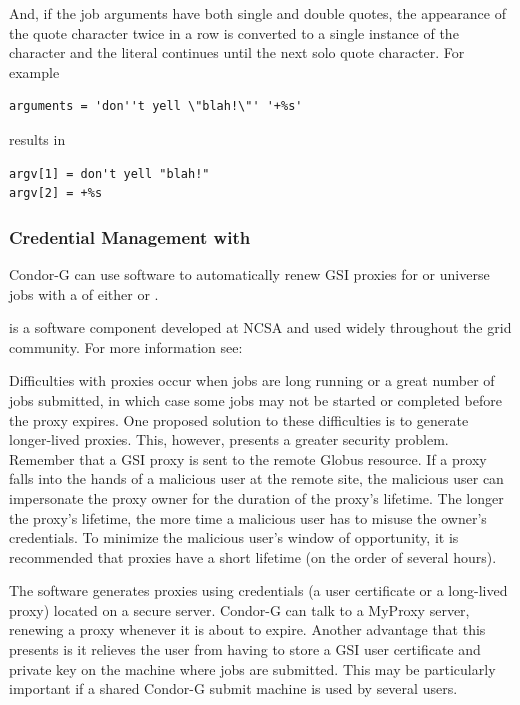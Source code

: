 And, if the job arguments have both single and double quotes,
the appearance of the quote character twice in a
row is converted to a single instance of the character and the literal
continues until the next solo quote character.
For example
\begin{verbatim}
arguments = 'don''t yell \"blah!\"' '+%s'
\end{verbatim}
results in
\begin{verbatim}
argv[1] = don't yell "blah!"
argv[2] = +%s
\end{verbatim}


\subsubsection{\label{sec:My-Proxy}Credential Management with }
Condor-G can use 
software to automatically renew GSI proxies for
 or
universe jobs with a
 of either
or
.

 is a software component developed at
NCSA and used widely throughout the grid community.
For more information see:

Difficulties with proxies occur
when jobs are long running or a
great number of jobs submitted,
in which case some jobs may not be started
or completed before the proxy expires.
One proposed solution to these difficulties is to generate
longer-lived proxies.
This, however, presents a greater security problem.
Remember that a GSI proxy is sent to the remote Globus resource.
If a proxy falls into the hands of a malicious user at the remote site,
the malicious user can impersonate the proxy owner
for the duration of the proxy's lifetime.
The longer the proxy's lifetime,
the more time a malicious user has to misuse the owner's credentials.
To minimize the malicious user's window of opportunity,
it is recommended that proxies have a short lifetime
(on the order of several hours).

The  software generates proxies using credentials
(a user certificate or a long-lived proxy) located on a secure
 server.
Condor-G can talk to a MyProxy server,
renewing a proxy whenever it is about to expire.
Another advantage that this presents is it relieves the user
from having to store a GSI user certificate and private key
on the machine where jobs are submitted.
This may be particularly important if a shared Condor-G
submit machine is used by several users.

